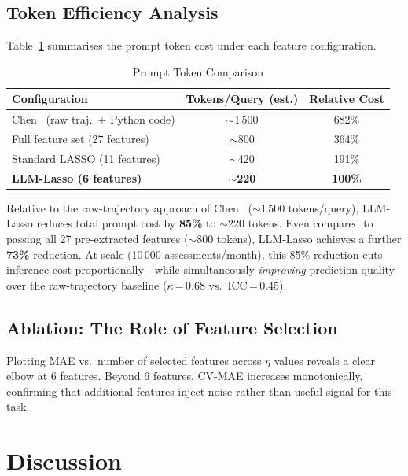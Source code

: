 \documentclass[conference]{IEEEtran}
\begin{document}
\subsection{Token Efficiency Analysis}

Table~\ref{tab:tokens} summarises the prompt token cost under each feature configuration.

\begin{table}[htbp]
    \centering
    \caption{Prompt Token Comparison}
    \label{tab:tokens}
    \renewcommand{\arraystretch}{1.2}
    \begin{tabular}{lcc}
        \toprule
        \textbf{Configuration} & \textbf{Tokens/Query (est.)} & \textbf{Relative Cost} \\
        \midrule
        Chen~\cite{chen2024chatgpt} (raw traj.\ + Python code) & $\sim$1\,500 & 682\% \\
        Full feature set (27 features)  & $\sim$800  & 364\% \\
        Standard LASSO (11 features)    & $\sim$420  & 191\% \\
        \textbf{LLM-Lasso (6 features)} & $\mathbf{\sim}$\textbf{220} & \textbf{100\%} \\
        \bottomrule
    \end{tabular}
\end{table}

Relative to the raw-trajectory approach of Chen~\cite{chen2024chatgpt} ($\sim$1\,500
tokens/query), LLM-Lasso reduces total prompt cost by \textbf{85\%} to $\sim$220 tokens.
Even compared to passing all 27 pre-extracted features ($\sim$800 tokens), LLM-Lasso
achieves a further \textbf{73\%} reduction. At scale (10\,000 assessments/month), this
85\% reduction cuts inference cost proportionally---while simultaneously \emph{improving}
prediction quality over the raw-trajectory baseline ($\kappa$\,=\,0.68 vs.\
ICC\,=\,0.45).

\subsection{Ablation: The Role of Feature Selection}

Plotting MAE vs.\ number of selected features across $\eta$ values reveals a clear elbow
at 6 features. Beyond 6 features, CV-MAE increases monotonically, confirming that
additional features inject noise rather than useful signal for this task.


\section{Discussion}
\end{document}
